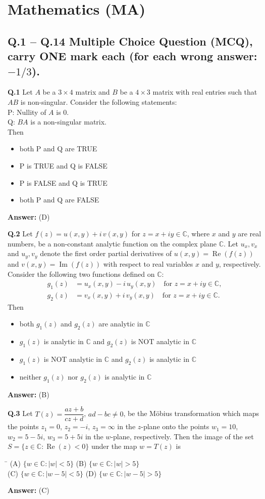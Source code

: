 \documentclass[11pt,a4paper]{article}
\newcommand{\optsfourA}[4]{%
  \begin{tabbing}
    \hspace{0.48\linewidth}\=\kill
    (A) #1 \> (B) #2 \\[2pt]
    (C) #3 \> (D) #4
  \end{tabbing}%
}
\newcommand{\optslistA}[4]{%
  \begin{itemize}
    \setlength{\itemsep}{2pt}\setlength{\parskip}{0pt}
    \item[(A)] #1
    \item[(B)] #2
    \item[(C)] #3
    \item[(D)] #4
  \end{itemize}%
}
\newcommand{\ans}[1]{\textbf{Answer:} #1\par\medskip}
\begin{document}
\section*{Mathematics (MA)}

\subsection*{Q.1 -- Q.14 Multiple Choice Question (MCQ), carry ONE mark each (for each wrong answer: $-1/3$).}

\textbf{Q.1} Let $A$ be a $3 \times 4$ matrix and $B$ be a $4 \times 3$ matrix with real entries such that $AB$ is non-singular. Consider the following statements:\\
P: Nullity of $A$ is $0$.\\
Q: $BA$ is a non-singular matrix.\\
Then
\optslistA{both P and Q are TRUE}{P is TRUE and Q is FALSE}{P is FALSE and Q is TRUE}{both P and Q are FALSE}
\ans{(D)}

\textbf{Q.2} Let $f(z) = u(x, y) + i\,v(x, y)$ for $z = x + iy \in \mathbb{C}$, where $x$ and $y$ are real numbers, be a non-constant analytic function on the complex plane $\mathbb{C}$. Let $u_x, v_x$ and $u_y, v_y$ denote the first order partial derivatives of $u(x, y) = \operatorname{Re}(f(z))$ and $v(x, y) = \operatorname{Im}(f(z))$ with respect to real variables $x$ and $y$, respectively. Consider the following two functions defined on $\mathbb{C}$:
\begin{align*}
  g_1(z) &= u_x(x, y) - i\,u_y(x, y) \quad \text{for } z = x + iy \in \mathbb{C}, \\
  g_2(z) &= v_x(x, y) + i\,v_y(x, y) \quad \text{for } z = x + iy \in \mathbb{C}.
\end{align*}
Then
\optslistA{both $g_1(z)$ and $g_2(z)$ are analytic in $\mathbb{C}$}{$g_1(z)$ is analytic in $\mathbb{C}$ and $g_2(z)$ is NOT analytic in $\mathbb{C}$}{$g_1(z)$ is NOT analytic in $\mathbb{C}$ and $g_2(z)$ is analytic in $\mathbb{C}$}{neither $g_1(z)$ nor $g_2(z)$ is analytic in $\mathbb{C}$}
\ans{(B)}

\textbf{Q.3} Let $T(z) = \dfrac{az + b}{cz + d}$, $ad - bc \neq 0$, be the M\"obius transformation which maps the points $z_1 = 0$, $z_2 = -i$, $z_3 = \infty$ in the $z$-plane onto the points $w_1 = 10$, $w_2 = 5 - 5i$, $w_3 = 5 + 5i$ in the $w$-plane, respectively. Then the image of the set $S = \{z \in \mathbb{C} : \operatorname{Re}(z) < 0\}$ under the map $w = T(z)$ is
\optsfourA{$\{w \in \mathbb{C} : |w| < 5\}$}{$\{w \in \mathbb{C} : |w| > 5\}$}{$\{w \in \mathbb{C} : |w - 5| < 5\}$}{$\{w \in \mathbb{C} : |w - 5| > 5\}$}
\ans{(C)}
\end{document}
